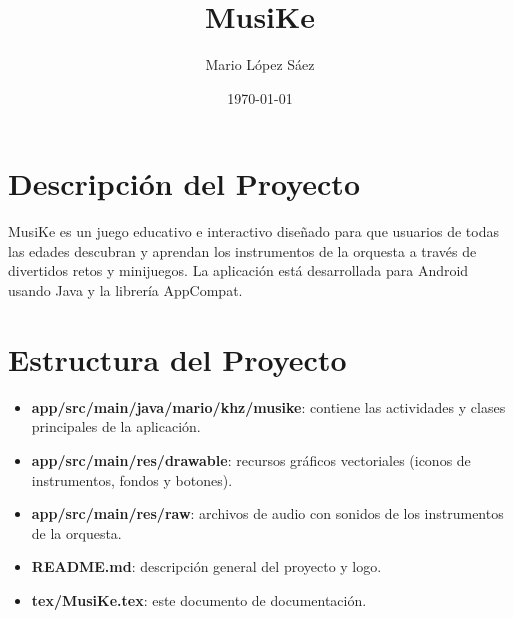\documentclass{article}
\newcommand{\iconpath}{/home/khz/git/tabler-icons/icons/outline-white/}
\newcommand{\icon}[1]{}
\begin{document}
\title{MusiKe}
\author{Mario López Sáez}
\date{\today}
\maketitle

\begin{center}

\end{center}

\tableofcontents
\newpage



\section{Descripción del Proyecto}

MusiKe es un juego educativo e interactivo diseñado para que usuarios de todas las edades descubran y aprendan los instrumentos de la orquesta a través de divertidos retos y minijuegos. La aplicación está desarrollada para Android usando Java y la librería AppCompat.

\section{Estructura del Proyecto}

\begin{itemize}
  \item \icon{folder} \textbf{app/src/main/java/mario/khz/musike}: contiene las actividades y clases principales de la aplicación.
  \item \icon{photo-scan} \textbf{app/src/main/res/drawable}: recursos gráficos vectoriales (iconos de instrumentos, fondos y botones).
  \item \icon{volume-2} \textbf{app/src/main/res/raw}: archivos de audio con sonidos de los instrumentos de la orquesta.
  \item \icon{file-text} \textbf{README.md}: descripción general del proyecto y logo.
  \item \icon{file} \textbf{tex/MusiKe.tex}: este documento de documentación.
\end{itemize}
\end{document}

